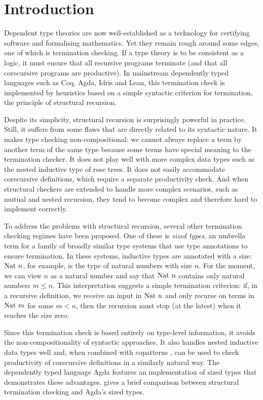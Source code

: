 \chapter{Introduction}

Dependent type theories are now well-established as a technology for certifying
software and formalising mathematics. Yet they remain rough around some edges,
one of which is termination checking. If a type theory is to be consistent as a
logic, it must ensure that all recursive programs terminate (and that all
corecursive programs are productive). In mainstream dependently typed languages
such as Coq, Agda, Idris and Lean, this termination check is implemented by
heuristics based on a simple syntactic criterion for termination, the principle
of structural recursion.

Despite its simplicity, structural recursion is surprisingly powerful in
practice. Still, it suffers from some flaws that are directly related to its
syntactic nature. It makes type checking non-compositional: we cannot always
replace a term by another term of the same type because some terms have special
meaning to the termination checker. It does not play well with more complex data
types such as the nested inductive type of rose trees. It does not easily
accommodate corecursive definitions, which require a separate productivity
check. And when structural checkers are extended to handle more complex
scenarios, such as mutual and nested recursion, they tend to become complex and
therefore hard to implement correctly.

To address the problems with structural recursion, several other termination
checking regimes have been proposed. One of these is \emph{sized types}, an
umbrella term for a family of broadly similar type systems that use type
annotations to ensure termination. In these systems, inductive types are
annotated with a size: $\mathrm{Nat}~n$, for example, is the type of natural numbers
with size $n$. For the moment, we can view $n$ as a natural number and say that
$\mathrm{Nat}~n$ contains only natural numbers $m ≤ n$. This interpretation suggests a
simple termination criterion: if, in a recursive definition, we receive an input
in $\mathrm{Nat}~n$ and only recurse on terms in $\mathrm{Nat}~m$ for some $m < n$, then the
recursion must stop (at the latest) when it reaches the size zero.

Since this termination check is based entirely on type-level information, it
avoids the non-compositionality of syntactic approaches. It also handles nested
inductive data types well and, when combined with copatterns \cite{abel2016},
can be used to check productivity of corecursive definitions in a similarly
natural way. The dependently typed language Agda features an implementation of
sized types that demonstrates these advantages.  gives a
brief comparison between structural termination checking and Agda's sized types.

